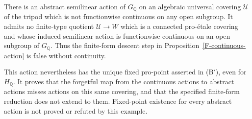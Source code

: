 \begin{proposition}
\label{F-discontinuous-action}
There is an abstract semilinear action of $G_{\mathbb Q}$ on
an algebraic universal covering $\mathcal U$ of the tripod
which is not functionwise continuous on any open subgroup.
It admits no finite-type quotient $\mathcal U\to W$ which
is a connected pro-\'etale covering and whose induced
semilinear action is functionwise continuous on an open
subgroup of $G_{\mathbb Q}$. Thus the finite-form descent
step in Proposition~\ref{F-continuous-action} is false
without continuity.

This action nevertheless has the unique fixed pro-point
asserted in (B$'$), even for $H_{\mathbb Q}$. It proves
that the forgetful map from the continuous actions to
abstract actions misses actions on this same covering, and
that the specified finite-form reduction does not extend
to them. Fixed-point existence for every abstract action
is not proved or refuted by this example.
\end{proposition}

